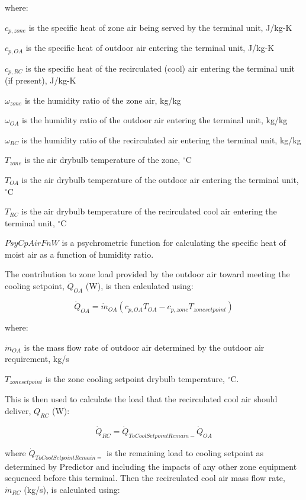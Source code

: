 where:

\(c_{p,zone}\) is the specific heat of zone air being served by the terminal unit, J/kg-K

\(c_{p,OA}\) is the specific heat of outdoor air entering the terminal unit, J/kg-K

\(c_{p,RC}\) is the specific heat of the recirculated (cool) air entering the terminal unit (if present), J/kg-K

\(\omega_{zone}\) is the humidity ratio of the zone air, kg/kg

\(\omega_{OA}\) is the humidity ratio of the outdoor air entering the terminal unit, kg/kg

\(\omega_{RC}\) is the humidity ratio of the recirculated air entering the terminal unit, kg/kg

\(T_{zone}\) is the air drybulb temperature of the zone, \(^{\circ}\)C

\(T_{OA}\) is the air drybulb temperature of the outdoor air entering the terminal unit, \(^{\circ}\)C

\(T_{RC}\) is the air drybulb temperature of the recirculated cool air entering the terminal unit, \(^{\circ}\)C

\(PsyCpAirFnW\) is a psychrometric function for calculating the specific heat of moist air as a function of humidity ratio.

The contribution to zone load provided by the outdoor air toward meeting the cooling setpoint, \({\dot Q_{OA}}\) (W), is then calculated using:

\begin{equation}
{\dot Q_{OA}} = {\dot m_{OA}}\left( {{c_{p,OA}}{T_{OA}} - {c_{p,zone}}{T_{zonesetpoint}}} \right)
\end{equation}

where:

\(\dot{m}_{OA}\) is the mass flow rate of outdoor air determined by the outdoor air requirement, kg/s

\(T_{zonesetpoint}\) is the zone cooling setpoint drybulb temperature, \(^{\circ}\)C.

This is then used to calculate the load that the recirculated cool air should deliver, \({Q_{RC}}\) (W):

\begin{equation}
{\dot Q_{RC}} = {\dot Q_{ToCoolSetpointRemain - }}{\dot Q_{OA}}
\end{equation}

where \({\dot Q_{ToCoolSetpointRemain = }}\) is the remaining load to cooling setpoint as determined by Predictor and including the impacts of any other zone equipment sequenced before this terminal. Then the recirculated cool air mass flow rate, \({\dot m_{RC}}\) (kg/s), is calculated using:

